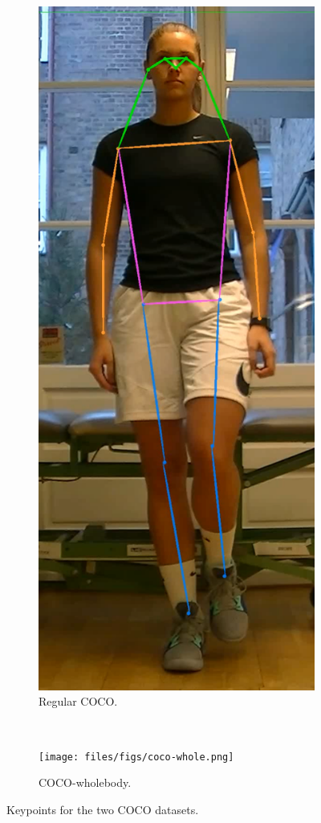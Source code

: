 \begin{figure}
\begin{subfigure}[t]{0.4\textwidth}
  \includegraphics[width=\textwidth]{files/figs/coco.png}
  \caption{Regular COCO.}
  \label{fig:coco}
 \end{subfigure}
 ~
 \begin{subfigure}[t]{0.4\textwidth}
  \texttt{[image: files/figs/coco-whole.png]}
  \caption{COCO-wholebody.}
  \label{fig:coco-wholebody}
 \end{subfigure}
 \caption{Keypoints for the two COCO datasets.}
\end{figure}


